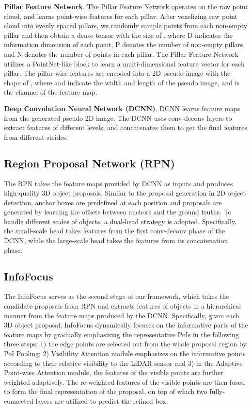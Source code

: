 \documentclass[runningheads]{llncs}
\begin{document}
\noindent\textbf{Pillar Feature Network}.
The Pillar Feature Network operates on the raw point cloud, and learns point-wise features for each pillar. After voxelizing raw point cloud into evenly spaced pillars, we randomly sample  points from each non-empty pillar and then obtain a dense tensor with the size of , where D indicates the information dimension of each point, P denotes the number of non-empty pillars, and N denotes the number of points in each pillar. The Pillar Feature Network utilizes a PointNet-like block to learn a multi-dimensional feature vector for each pillar. The pillar-wise features are encoded into a 2D pseudo image with the shape of , where  and  indicate the width and length of the pseudo image, and  is the channel of the feature map. 

\noindent\textbf{Deep Convolution Neural Network (DCNN)}.
DCNN learns feature maps from the generated pseudo 2D image. The DCNN uses conv-deconv layers to extract features of different levels, and concatenates them to get the final features from different strides.

\subsection{Region Proposal Network (RPN)}
The RPN takes the feature maps provided by DCNN as inputs and produces high-quality 3D object proposals. Similar to the proposal generation in 2D object detection, anchor boxes are predefined at each position and proposals are generated by learning the offsets between anchors and the ground truths. To handle different scales of objects, a dual-head strategy is adopted. Specifically, the small-scale head takes features from the first conv-deconv phase of the DCNN, while the large-scale head takes the features from its concatenation phase.

\subsection{InfoFocus}
The InfoFocus serves as the second stage of our framework, which takes the candidate proposals from RPN and extracts features of objects in a hierarchical manner from the feature maps produced by the DCNN. Specifically, given each 3D object proposal, InfoFocus dynamically focuses on the informative parts of the feature maps by gradually emphasizing the representative PoIs in the following three steps: 1) the edge points are selected out from the whole proposal region by PoI Pooling; 2) Visibility Attention module emphasizes on the informative points according to their relative visibility to the LiDAR sensor and 3) in the Adaptive Point-wise Attention module, the features of the visible points are further weighted adaptively. The re-weighted features of the visible points are then fused to form the final representation of the proposal, on top of which two fully-connected layers are utilized to predict the refined box.
\end{document}
